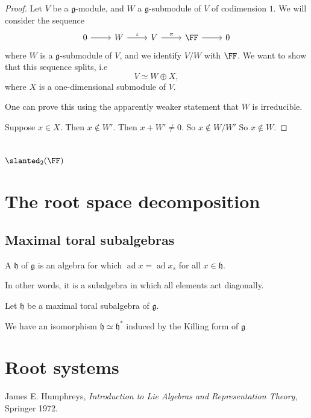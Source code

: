 \documentclass{article}
\newcommand*\ad{\operatorname{ad}}
\newcommand*\frkg{{\ensuremath{\mathfrak{g}}}}
\newcommand*\frkh{{\ensuremath{\mathfrak{h}}}}
\let\sl\slanted
\newcommand*\sl{\ensuremath{\mathfrak{sl}}}
\begin{document}
\begin{proof}
    Let $V$ be a $\frkg$-module, and $W$ a $\frkg$-submodule of $V$ of codimension $1$.
    We will consider the sequence
    \[
        \begin{tikzcd}
            0 \arrow[r] & W \arrow[r, "\iota"] & V \arrow[r, "\pi"] & \FF \arrow[r] & 0
        \end{tikzcd}
    \]
    where $W$ is a $\frkg$-submodule of $V$, and we identify $V/W$ with $\FF$.
    We want to show that this sequence splits, i.e
    \[
        V 
        \simeq 
        W \oplus X,
    \]
    where $X$ is a one-dimensional submodule of $V$.

    One can prove this using the apparently weaker statement that $W$ is irreducible.

    Suppose $x \in X$.
    Then $x \notin W'$.
    Then $x + W' \neq 0$.
    So $x \notin W/W'$
    So $x \notin W$.
\end{proof}

\section{
\texorpdfstring{$\sl_2(\FF)$}{sl2(F)}
}

\section{The root space decomposition}

\subsection{Maximal toral subalgebras}

\begin{definition}
    A  $\frkh$ of $\frkg$ is an algebra for which $\ad x = \ad x_s$ for all $x \in \frkh$.
\end{definition}

In other words, it is a subalgebra in which all elements act diagonally.

\begin{proposition}
    Let $\frkh$ be a maximal toral subalgebra of $\frkg$.

    We have an isomorphism $\frkh \simeq \frkh^\ast$ induced by the Killing form of $\frkg$
\end{proposition}

\section{Root systems}

\begin{definition}
\end{definition}

\begin{thebibliography}{999999}
    \raggedright\footnotesize

    James E. Humphreys, \textit{Introduction to Lie Algebras and Representation Theory}, Springer 1972.

\end{thebibliography}
\end{document}
